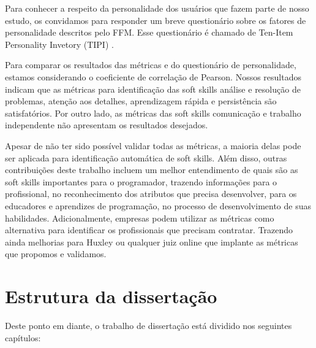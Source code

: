Para conhecer a respeito da personalidade dos usuários que fazem parte de nosso estudo, os convidamos para responder um breve questionário sobre os fatores de personalidade descritos pelo FFM. Esse questionário é chamado de Ten-Item Personality Invetory (TIPI) \cite{gosling:03}.

Para comparar os resultados das métricas e do questionário de personalidade, estamos considerando o coeficiente de correlação de Pearson. Nossos resultados indicam que as métricas para identificação das soft skills análise e resolução de problemas, atenção aos detalhes, aprendizagem rápida e persistência são satisfatórios. Por outro lado, as métricas das soft skills comunicação e trabalho independente não apresentam os resultados desejados. 

Apesar de não ter sido possível validar todas as métricas, a maioria delas pode ser aplicada para identificação automática de soft skills. Além disso, outras contribuições deste trabalho incluem um melhor entendimento de quais são as soft skills importantes para o programador, trazendo informações para o profissional, no reconhecimento dos atributos que precisa desenvolver, para os educadores e aprendizes de programação, no processo de desenvolvimento de suas habilidades. Adicionalmente, empresas podem utilizar as métricas como alternativa para identificar os profissionais que precisam contratar. Trazendo ainda melhorias para Huxley ou qualquer juiz online que implante as métricas que propomos e validamos.

\section{Estrutura da dissertação}

Deste ponto em diante, o trabalho de dissertação está dividido nos seguintes capítulos:

